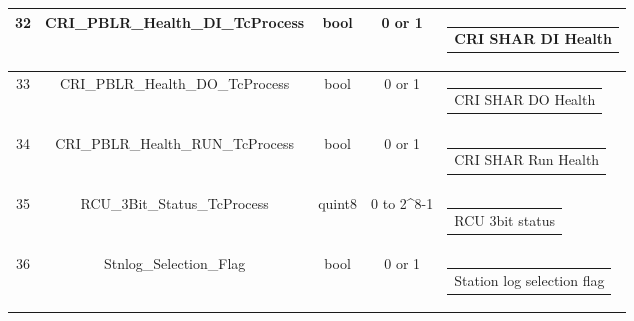 \begin{landscape}
\begin{longtable}[c]{|c|c|c|c|c|}
		32             & CRI\_PBLR\_Health\_DI\_TcProcess                                                  & bool            & 0 or 1                                                                                               & \begin{tabular}[c]{@{}c@{}} CRI SHAR DI Health \end{tabular}                      \\ \hline
		33             & CRI\_PBLR\_Health\_DO\_TcProcess                                                  & bool            & 0 or 1                                                                                              & \begin{tabular}[c]{@{}c@{}} CRI SHAR DO Health \end{tabular}                      \\ \hline
		34             & CRI\_PBLR\_Health\_RUN\_TcProcess                                                  & bool            & 0 or 1                                                                                              & \begin{tabular}[c]{@{}c@{}} CRI SHAR Run Health \end{tabular}                      \\ \hline
		35             & RCU\_3Bit\_Status\_TcProcess                                                  & quint8          & 0 to 2\textasciicircum 8-1                                                                                       & \begin{tabular}[c]{@{}c@{}} RCU 3bit status \end{tabular}                      \\ \hline
		36             & Stnlog\_Selection\_Flag                                     & bool          & 0 or 1                                                                        & \begin{tabular}[c]{@{}c@{}} Station log selection flag \end{tabular}                      \\ \hline
		

\end{longtable}
\end{landscape}
